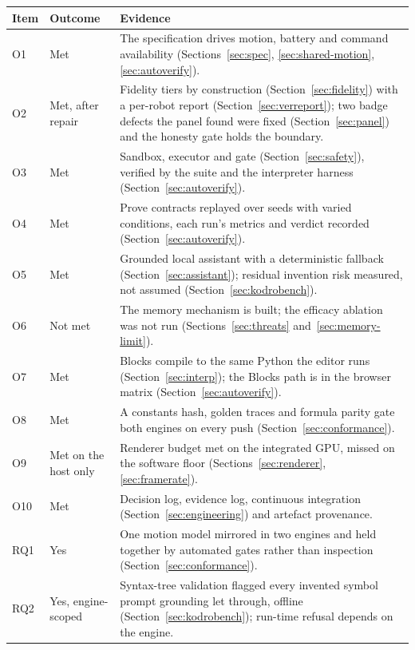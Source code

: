 \documentclass[11pt,a4paper]{report}
\begin{document}
\begin{table}[h]
\centering\footnotesize
\renewcommand{\arraystretch}{0.95}
\begin{tabular}{@{}p{0.9cm}p{2.5cm}p{11.6cm}@{}}
\toprule
Item & Outcome & Evidence \\
\midrule
O1 & Met & The specification drives motion, battery and command availability (Sections~\ref{sec:spec}, \ref{sec:shared-motion}, \ref{sec:autoverify}). \\
O2 & Met, after repair & Fidelity tiers by construction (Section~\ref{sec:fidelity}) with a per-robot report (Section~\ref{sec:verreport}); two badge defects the panel found were fixed (Section~\ref{sec:panel}) and the honesty gate holds the boundary. \\
O3 & Met & Sandbox, executor and gate (Section~\ref{sec:safety}), verified by the suite and the interpreter harness (Section~\ref{sec:autoverify}). \\
O4 & Met & Prove contracts replayed over seeds with varied conditions, each run's metrics and verdict recorded (Section~\ref{sec:autoverify}). \\
O5 & Met & Grounded local assistant with a deterministic fallback (Section~\ref{sec:assistant}); residual invention risk measured, not assumed (Section~\ref{sec:kodrobench}). \\
O6 & Not met & The memory mechanism is built; the efficacy ablation was not run (Sections~\ref{sec:threats} and~\ref{sec:memory-limit}). \\
O7 & Met & Blocks compile to the same Python the editor runs (Section~\ref{sec:interp}); the Blocks path is in the browser matrix (Section~\ref{sec:autoverify}). \\
O8 & Met & A constants hash, golden traces and formula parity gate both engines on every push (Section~\ref{sec:conformance}). \\
O9 & Met on the host only & Renderer budget met on the integrated GPU, missed on the software floor (Sections~\ref{sec:renderer}, \ref{sec:framerate}). \\
O10 & Met & Decision log, evidence log, continuous integration (Section~\ref{sec:engineering}) and artefact provenance. \\
RQ1 & Yes & One motion model mirrored in two engines and held together by automated gates rather than inspection (Section~\ref{sec:conformance}). \\
RQ2 & Yes, engine-scoped & Syntax-tree validation flagged every invented symbol prompt grounding let through, offline (Section~\ref{sec:kodrobench}); run-time refusal depends on the engine. \\

\end{tabular}
\end{table}
\end{document}
